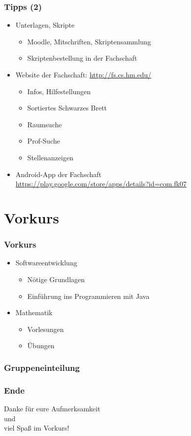 \documentclass{beamer}
\begin{document}
\begin{frame}
\frametitle{Tipps (2)}
\begin{itemize}
	\item Unterlagen, Skripte
		\begin{itemize}
			\item Moodle, Mitschriften, Skriptensammlung
			\item Skriptenbestellung in der Fachschaft
		\end{itemize}
	\pause
	\item Website der Fachschaft: \scriptsize\url{http://fs.cs.hm.edu/}\normalsize
		\begin{itemize}
			\item Infos, Hilfestellungen
			\item Sortiertes Schwarzes Brett
			\item Raumsuche
			\item Prof-Suche
			\item Stellenanzeigen
		\end{itemize}
	\pause
	\item Android-App der Fachschaft\\
		\scriptsize\url{https://play.google.com/store/apps/details?id=com.fk07}\normalsize
\end{itemize}
\end{frame}


\section{Vorkurs}
\begin{frame}
\frametitle{Vorkurs}
\begin{itemize}
	\item Softwareentwicklung
		\begin{itemize}
			\item Nötige Grundlagen
			\item Einführung ins Programmieren mit Java
		\end{itemize}
	\pause
	\item Mathematik
		\begin{itemize}
			\item Vorlesungen
			\item Übungen
		\end{itemize}
\end{itemize}
\end{frame}


\begin{frame}
\frametitle{Gruppeneinteilung}
\end{frame}


\begin{frame}
\frametitle{Ende}
\begin{center}
Danke für eure Aufmerksamkeit\\
und\\
viel Spaß im Vorkurs!
\end{center}
\end{frame}
\end{document}
